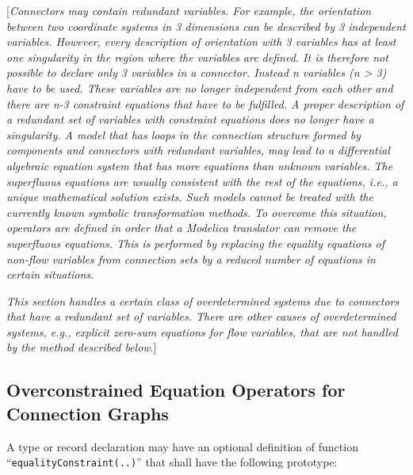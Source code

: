 {[}\emph{Connectors may contain redundant variables. For example, the
orientation between two coordinate systems in 3 dimensions can be
described by 3 independent variables. However, every description of
orientation with 3 variables has at least one singularity in the region
where the variables are defined. It is therefore not possible to declare
only 3 variables in a connector. Instead n variables (n \textgreater{}
3) have to be used. These variables are no longer independent from each
other and there are n-3 constraint equations that have to be fulfilled.
A proper description of a redundant set of variables with constraint
equations does no longer have a singularity. A model that has loops in
the connection structure formed by components and connectors with
redundant variables, may lead to a differential algebraic equation
system that has more equations than unknown variables. The superfluous
equations are usually consistent with the rest of the equations, i.e., a
unique mathematical solution exists. Such models cannot be treated with
the currently known symbolic transformation methods. To overcome this
situation, operators are defined in order that a Modelica translator can
remove the superfluous equations. This is performed by replacing the
equality equations of non-flow variables from connection sets by a
reduced number of equations in certain situations.}

\emph{This section handles a certain class of overdetermined systems due
to connectors that have a redundant set of variables. There are other
causes of overdetermined systems, e.g., explicit zero-sum equations for
flow variables, that are not handled by the method described below}.{]}

\subsection{Overconstrained Equation Operators for Connection Graphs}

A type or record declaration may have an optional definition of function
``\lstinline!equalityConstraint(..)!'' that shall have the following prototype:

